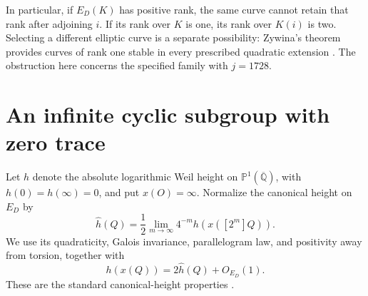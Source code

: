 \documentclass[11pt,a4paper]{article}
\newcommand{\Q}{\mathbb Q}\newcommand{\Z}{\mathbb Z}
\begin{document}
In particular, if $E_D(K)$ has positive rank, the same curve
cannot retain that rank after adjoining $i$. If its rank over $K$
is one, its rank over $K(i)$ is two. Selecting a different elliptic
curve is a separate possibility: Zywina's theorem provides curves
of rank one stable in every prescribed quadratic extension
\cite[Theorem 1.2]{Zywina}. The obstruction here concerns the
specified family with $j=1728$.

\section{An infinite cyclic subgroup with zero trace}

Let $h$ denote the absolute logarithmic Weil height on
$\mathbb P^1(\overline{\Q})$, with $h(0)=h(\infty)=0$, and put
$x(O)=\infty$.
Normalize the canonical height on $E_D$ by
\[
 \widehat h(Q)=\frac12\lim_{m\to\infty}4^{-m}
                                      h(x([2^m]Q)).
\]
We use its quadraticity, Galois invariance, parallelogram law, and
positivity away from torsion, together with
\begin{equation}\label{eq:heightcomparison}
                  h(x(Q))=2\widehat h(Q)+O_{E_D}(1).
\end{equation}
These are the standard canonical-height properties
\cite[Chapter VIII, Section 9]{Silverman}.
\end{document}
